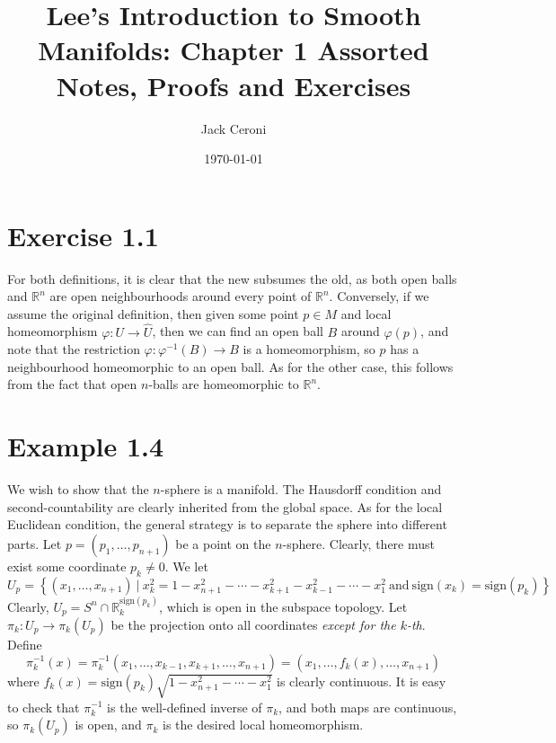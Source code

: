 \documentclass[aps,pra,showpacs,notitlepage,onecolumn,superscriptaddress,nofootinbib]{revtex4-1}
\theoremstyle{definition}
\begin{document}
\title{Lee's Introduction to Smooth Manifolds: Chapter 1 Assorted Notes, Proofs and Exercises}

\author{Jack Ceroni}

\date{\today}

\maketitle


\section{Exercise 1.1}
\label{sec:11}

\noindent
For both definitions, it is clear that the new subsumes the old, as both open balls and $\mathbb{R}^{n}$ are open neighbourhoods around every point of $\mathbb{R}^{n}$.
Conversely, if we assume the original definition, then given some point $p \in M$ and local homeomorphism $\varphi : U \rightarrow \widehat{U}$, then we can find an open ball
$B$ around $\varphi(p)$, and note that the restriction $\varphi : \varphi^{-1}(B) \rightarrow B$ is a homeomorphism, so $p$ has a neighbourhood homeomorphic to an open ball.
As for the other case, this follows from the fact that open $n$-balls are homeomorphic to $\mathbb{R}^{n}$.

\hrulefill

\section{Example 1.4}

\noindent
We wish to show that the $n$-sphere is a manifold. The Hausdorff condition and second-countability are clearly inherited from the global space. As for the local Euclidean condition,
the general strategy is to separate the sphere into different parts. Let $p = (p_1, \dots, p_{n + 1})$ be a point on the $n$-sphere. Clearly, there must exist some coordinate $p_k \neq 0$. We let
\begin{equation}
  U_p = \left\{ (x_1, \dots, x_{n + 1}) \ | \ x_{k}^2 = 1 - x_{n + 1}^2 - \cdots - x_{k + 1}^2 - x_{k - 1}^2 - \cdots - x_1^2 \ \text{and} \ \text{sign}(x_k) = \text{sign}(p_k) \right\}
  \end{equation}
Clearly, $U_p = S^{n} \cap \mathbb{R}_k^{\text{sign}(p_k)}$, which is open in the subspace topology. Let $\pi_k : U_p \rightarrow \pi_k(U_p)$ be the projection onto all coordinates \textit{except for the $k$-th}.
Define
\begin{equation}
  \pi_k^{-1}(x) = \pi_k^{-1}(x_1, \dots, x_{k - 1}, x_{k + 1}, \dots, x_{n + 1}) = (x_1, \dots, f_k(x), \dots, x_{n + 1})
\end{equation}
where $f_k(x) = \text{sign}(p_k) \sqrt{1 - x_{n + 1}^2 - \cdots - x_1^{2}}$ is clearly continuous. It is easy to check that $\pi_k^{-1}$ is the well-defined inverse of $\pi_k$, and both maps are continuous,
so $\pi_k(U_p)$ is open, and $\pi_k$ is the desired local homeomorphism.
\end{document}
